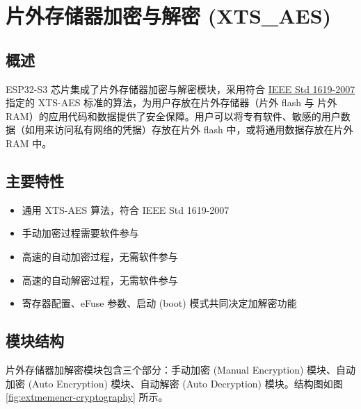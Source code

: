\documentclass[main\_\_CN.tex]{subfiles}
\begin{document}

\ifglobal
\else
    {\let\clearpage\relax \listoftodos}
    \tableofcontents
\fi



\hypertarget{extmemencr}{}
\chapter{片外存储器加密与解密 (XTS\_AES)}
\label{mod:extmemencr}


\section{概述}

ESP32-S3 芯片集成了片外存储器加密与解密模块，采用符合 \href{https://ieeexplore.ieee.org/document/4493450}{IEEE Std 1619-2007} 指定的 XTS-AES 标准的算法，为用户存放在片外存储器（片外 flash 与 片外 RAM）的应用代码和数据提供了安全保障。用户可以将专有软件、敏感的用户数据（如用来访问私有网络的凭据）存放在片外 flash 中，或将通用数据存放在片外 RAM 中。


\section{主要特性}

\begin{itemize}
    \item 通用 XTS-AES 算法，符合 IEEE Std 1619-2007
    \item 手动加密过程需要软件参与
    \item 高速的自动加密过程，无需软件参与
    \item 高速的自动解密过程，无需软件参与
    \item 寄存器配置、eFuse 参数、启动 (boot) 模式共同决定加解密功能
\end{itemize}


\section{模块结构}
片外存储器加解密模块包含三个部分：手动加密 (Manual Encryption) 模块、自动加密 (Auto Encryption) 模块、自动解密 (Auto Decryption) 模块。结构图如图 \ref{fig:extmemencr-cryptography} 所示。
\end{document}

